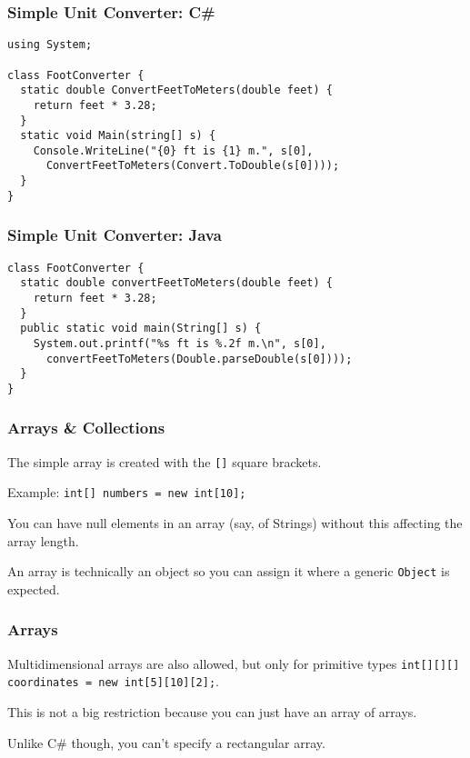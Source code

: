 \begin{frame}[fragile]
\frametitle{Simple Unit Converter: C\#}
\begin{changemargin}{1cm}

{\scriptsize
\begin{verbatim}
using System;

class FootConverter {
  static double ConvertFeetToMeters(double feet) {
    return feet * 3.28;
  }
  static void Main(string[] s) {
    Console.WriteLine("{0} ft is {1} m.", s[0], 
      ConvertFeetToMeters(Convert.ToDouble(s[0])));
  }
}
\end{verbatim}
}

\end{changemargin}
\end{frame}

\begin{frame}[fragile]
\frametitle{Simple Unit Converter: Java}
\begin{changemargin}{1cm}

{\scriptsize
\begin{verbatim}
class FootConverter {
  static double convertFeetToMeters(double feet) {
    return feet * 3.28;
  }
  public static void main(String[] s) {
    System.out.printf("%s ft is %.2f m.\n", s[0],
      convertFeetToMeters(Double.parseDouble(s[0])));
  }
}
\end{verbatim}
}

\end{changemargin}
\end{frame}

\begin{frame}
\frametitle{Arrays \& Collections}
\begin{changemargin}{1cm}

The simple array is created with the \texttt{[]} square brackets. 

Example: \texttt{int[] numbers = new int[10];}

You can have null elements in an array (say, of Strings) without this affecting the array length. 

An array is technically an object so you can assign it where a generic \texttt{Object} is expected. 


\end{changemargin}
\end{frame}

\begin{frame}
\frametitle{Arrays}
\begin{changemargin}{1cm}

Multidimensional arrays are also allowed, but only for primitive types \texttt{int[][][] coordinates = new int[5][10][2];}.  

This is not a big restriction because you can just have an array of arrays. 

Unlike C\# though, you can't specify a rectangular array.

\end{changemargin}
\end{frame}

